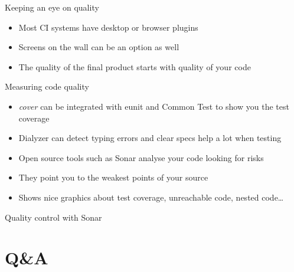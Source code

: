 \documentclass[pdf]{beamer}
\begin{document}
\begin{frame}{Keeping an eye on quality}
    \begin{itemize}
    \item Most CI systems have desktop or browser plugins
    \pause
    \item Screens on the wall can be an option as well
    \pause
    \item The quality of the final product starts with quality of your code
    \end{itemize}
\end{frame}

\begin{frame}{Measuring code quality}
    \begin{itemize}
    \item \emph{cover} can be integrated with eunit and Common Test to show you the test coverage
    \pause
    \item Dialyzer can detect typing errors and clear specs help a lot when testing
    \pause
    \item Open source tools such as Sonar analyse your code looking for risks
    \pause
    \item They point you to the weakest points of your source
    \pause
    \item Shows nice graphics about test coverage, unreachable code, nested code\dots
    \end{itemize}
\end{frame}

\begin{frame}{Quality control with Sonar}
\end{frame}

\section{Q\&A}
\end{document}
